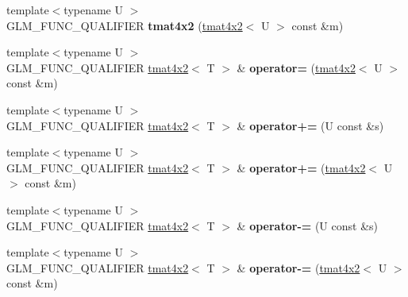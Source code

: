 \begin{DoxyCompactItemize}
\item 
\hypertarget{structglm_1_1detail_1_1tmat4x2_a410520189e090aec0b69fc9d29a96fb4}{}{\footnotesize template$<$typename U $>$ }\\G\+L\+M\+\_\+\+F\+U\+N\+C\+\_\+\+Q\+U\+A\+L\+I\+F\+I\+E\+R {\bfseries tmat4x2} (\hyperlink{structglm_1_1detail_1_1tmat4x2}{tmat4x2}$<$ U $>$ const \&m)\label{structglm_1_1detail_1_1tmat4x2_a410520189e090aec0b69fc9d29a96fb4}

\item 
\hypertarget{structglm_1_1detail_1_1tmat4x2_a22085e9d4dbabdf4375008e544336b7b}{}{\footnotesize template$<$typename U $>$ }\\G\+L\+M\+\_\+\+F\+U\+N\+C\+\_\+\+Q\+U\+A\+L\+I\+F\+I\+E\+R \hyperlink{structglm_1_1detail_1_1tmat4x2}{tmat4x2}$<$ T $>$ \& {\bfseries operator=} (\hyperlink{structglm_1_1detail_1_1tmat4x2}{tmat4x2}$<$ U $>$ const \&m)\label{structglm_1_1detail_1_1tmat4x2_a22085e9d4dbabdf4375008e544336b7b}

\item 
\hypertarget{structglm_1_1detail_1_1tmat4x2_a86666c2f75792c38b915e1619c88b254}{}{\footnotesize template$<$typename U $>$ }\\G\+L\+M\+\_\+\+F\+U\+N\+C\+\_\+\+Q\+U\+A\+L\+I\+F\+I\+E\+R \hyperlink{structglm_1_1detail_1_1tmat4x2}{tmat4x2}$<$ T $>$ \& {\bfseries operator+=} (U const \&s)\label{structglm_1_1detail_1_1tmat4x2_a86666c2f75792c38b915e1619c88b254}

\item 
\hypertarget{structglm_1_1detail_1_1tmat4x2_afce1257e8143d2f4b3db5dadcf0ccec2}{}{\footnotesize template$<$typename U $>$ }\\G\+L\+M\+\_\+\+F\+U\+N\+C\+\_\+\+Q\+U\+A\+L\+I\+F\+I\+E\+R \hyperlink{structglm_1_1detail_1_1tmat4x2}{tmat4x2}$<$ T $>$ \& {\bfseries operator+=} (\hyperlink{structglm_1_1detail_1_1tmat4x2}{tmat4x2}$<$ U $>$ const \&m)\label{structglm_1_1detail_1_1tmat4x2_afce1257e8143d2f4b3db5dadcf0ccec2}

\item 
\hypertarget{structglm_1_1detail_1_1tmat4x2_a5e7bfc69bf41ec3a50c601d1799df414}{}{\footnotesize template$<$typename U $>$ }\\G\+L\+M\+\_\+\+F\+U\+N\+C\+\_\+\+Q\+U\+A\+L\+I\+F\+I\+E\+R \hyperlink{structglm_1_1detail_1_1tmat4x2}{tmat4x2}$<$ T $>$ \& {\bfseries operator-\/=} (U const \&s)\label{structglm_1_1detail_1_1tmat4x2_a5e7bfc69bf41ec3a50c601d1799df414}

\item 
\hypertarget{structglm_1_1detail_1_1tmat4x2_ab94005c56c37075bd5ef5c40961d8df1}{}{\footnotesize template$<$typename U $>$ }\\G\+L\+M\+\_\+\+F\+U\+N\+C\+\_\+\+Q\+U\+A\+L\+I\+F\+I\+E\+R \hyperlink{structglm_1_1detail_1_1tmat4x2}{tmat4x2}$<$ T $>$ \& {\bfseries operator-\/=} (\hyperlink{structglm_1_1detail_1_1tmat4x2}{tmat4x2}$<$ U $>$ const \&m)\label{structglm_1_1detail_1_1tmat4x2_ab94005c56c37075bd5ef5c40961d8df1}


\end{DoxyCompactItemize}
